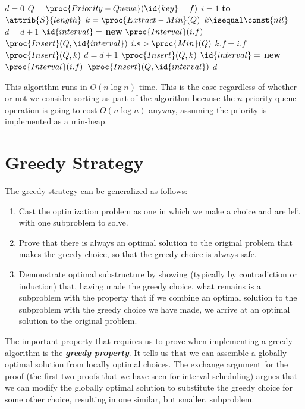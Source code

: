 \begin{codebox}
    \li $d = 0$
    \zi {} 
    \li $Q = \proc{Priority-Queue}(\id{key}=f)$ 
    \li \For $i = 1$ \textbf{to} $\attrib{S}{length}$ \Do
        \li $k = \proc{Extract-Min}(Q)$
        \li \If $k \isequal \const{nil}$ \Then
            \li $d = d + 1$
            \li $\id{interval} = $ \textbf{new} $\proc{Interval}(i.f)$ 
            \li $\proc{Insert}(Q,\id{interval})$
        \End
        \li \If $i.s > \proc{Min}(Q)$ \Then
            \zi {}
            \li $k.f = i.f$
            \li $\proc{Insert}(Q, k)$
        \li \Else
            \zi {}
            \li $d = d + 1$
            \li $\proc{Insert}(Q, k)$
            \li $\id{interval} = $ \textbf{new} $\proc{Interval}(i.f)$
            \li $\proc{Insert}(Q,\id{interval})$
        \End
    \End
    \li \Return $d$
\end{codebox}

This algorithm runs in $O(n \log n)$ time. This is the case regardless of whether or not we consider sorting as part of the algorithm because the $n$ priority queue operation is going to cost $O(n \log n)$ anyway, assuming the priority is implemented as a min-heap.

\section{Greedy Strategy}

The greedy strategy can be generalized as follows:

\begin{enumerate}
    \item Cast the optimization problem as one in which we make a choice and are left with one subproblem to solve.
    \item Prove that there is always an optimal solution to the original problem that makes the greedy choice, so that the greedy choice is always safe.
    \item Demonstrate optimal substructure by showing (typically by contradiction or induction) that, having made the greedy choice, what remains is a subproblem with the property that if we combine an optimal solution to the subproblem with the greedy choice we have made, we arrive at an optimal solution to the original problem.
\end{enumerate}

The important property that requires us to prove when implementing a greedy algorithm is the \textit{\textbf{greedy property}}. It tells us that we can assemble a globally optimal solution from locally optimal choices. The exchange argument for the proof (the first two proofs that we have seen for interval scheduling) argues that we can modify the globally optimal solution to substitute the greedy choice for some other choice, resulting in one similar, but smaller, subproblem.